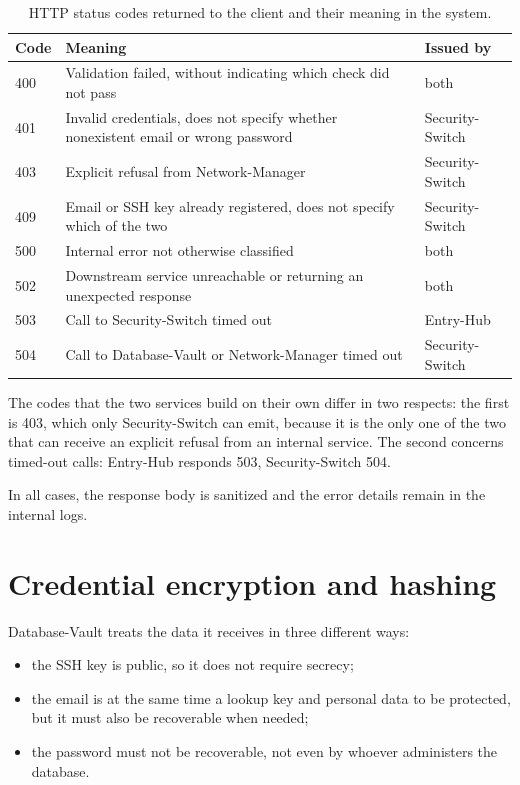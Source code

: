 \begin{table}[H]
\centering
\caption{HTTP status codes returned to the client and their meaning in the system.}
\label{tab:codici-http}
\begin{tabular}{@{}l p{} l@{}}
\hline
\textbf{Code} & \textbf{Meaning} & \textbf{Issued by} \\
\hline
400 & Validation failed, without indicating which check did not pass & both \\
401 & Invalid credentials, does not specify whether nonexistent email or wrong password & Security-Switch \\
403 & Explicit refusal from Network-Manager & Security-Switch \\
409 & Email or SSH key already registered, does not specify which of the two & Security-Switch \\
500 & Internal error not otherwise classified & both \\
502 & Downstream service unreachable or returning an unexpected response & both \\
503 & Call to Security-Switch timed out & Entry-Hub \\
504 & Call to Database-Vault or Network-Manager timed out & Security-Switch \\
\hline
\end{tabular}
\end{table}

The codes that the two services build on their own differ in two respects:
the first is 403, which only Security-Switch can emit, because it is the only one of the two that can receive an
explicit refusal from an internal service. The second concerns timed-out calls: Entry-Hub responds 503,
Security-Switch 504.

In all cases, the response body is sanitized and the error details remain in the internal
logs.

\section{Credential encryption and hashing}

Database-Vault treats the data it receives in three different ways:

\begin{itemize}
    \item the SSH key is public, so it does not require secrecy;
    \item the email is at the same time a lookup key and personal data to be protected, but it must also be
		recoverable when needed;
    \item the password must not be recoverable, not even by whoever administers the database.
\end{itemize}

